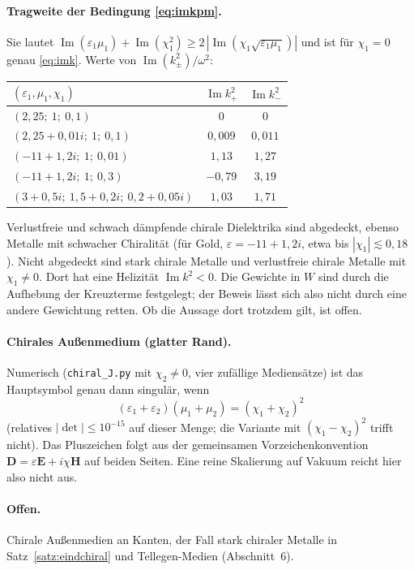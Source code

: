 \documentclass[11pt, a4paper]{article}
\newcommand{\mvec}[1]{\boldsymbol{#1}}
\theoremstyle{plain}
\theoremstyle{definition}
\begin{document}
\paragraph{Tragweite der Bedingung \eqref{eq:imkpm}.} Sie lautet
$\operatorname{Im}(\varepsilon_1\mu_1)+\operatorname{Im}(\chi_1^2)\ge2\,|\operatorname{Im}(\chi_1\sqrt{\varepsilon_1\mu_1})|$
und ist für $\chi_1=0$ genau \eqref{eq:imk}. Werte von $\operatorname{Im}(k_\pm^2)/\omega^2$:
\begin{center}\small
\begin{tabular}{lcc}
\toprule
$(\varepsilon_1,\mu_1,\chi_1)$ & $\operatorname{Im}k_+^2$ & $\operatorname{Im}k_-^2$\\
\midrule
$(2{,}25;\ 1;\ 0{,}1)$ & $0$ & $0$\\
$(2{,}25+0{,}01i;\ 1;\ 0{,}1)$ & $0{,}009$ & $0{,}011$\\
$(-11+1{,}2i;\ 1;\ 0{,}01)$ & $1{,}13$ & $1{,}27$\\
$(-11+1{,}2i;\ 1;\ 0{,}3)$ & $-0{,}79$ & $3{,}19$\\
$(3+0{,}5i;\ 1{,}5+0{,}2i;\ 0{,}2+0{,}05i)$ & $1{,}03$ & $1{,}71$\\
\bottomrule
\end{tabular}
\end{center}
Verlustfreie und schwach dämpfende chirale Dielektrika sind abgedeckt, ebenso
Metalle mit schwacher Chiralität (für Gold, $\varepsilon=-11+1{,}2i$, etwa bis
$|\chi_1|\lesssim0{,}18$). Nicht abgedeckt sind stark chirale Metalle und verlustfreie
chirale Metalle mit $\chi_1\neq0$. Dort hat eine Helizität $\operatorname{Im}k^2<0$.
Die Gewichte in $W$ sind durch die Aufhebung der Kreuzterme festgelegt; der Beweis
lässt sich also nicht durch eine andere Gewichtung retten. Ob die Aussage dort
trotzdem gilt, ist offen.

\paragraph{Chirales Außenmedium (glatter Rand).} Numerisch
(\texttt{chiral\_J.py} mit $\chi_2\ne0$, vier zufällige Mediensätze) ist das
Hauptsymbol genau dann singulär, wenn
\[
  (\varepsilon_1+\varepsilon_2)(\mu_1+\mu_2)=(\chi_1+\chi_2)^2
\]
(relatives $|\det|\le10^{-15}$ auf dieser Menge; die Variante mit $(\chi_1-\chi_2)^2$
trifft nicht). Das Pluszeichen folgt aus der gemeinsamen Vorzeichenkonvention
$\mvec{D}=\varepsilon\mvec{E}+i\chi\mvec{H}$ auf beiden Seiten. Eine reine Skalierung auf
Vakuum reicht hier also nicht aus.

\paragraph{Offen.} Chirale Außenmedien an Kanten,
der Fall stark chiraler Metalle in Satz~\ref{satz:eindchiral} und Tellegen-Medien
(Abschnitt~6).
\end{document}
